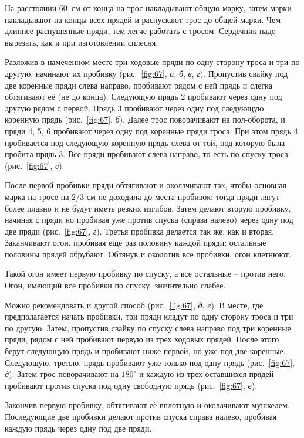 \documentclass[a4paper, 12pt, twoside, final]{scrbook}
\begin{document}
На расстоянии 60~см от конца на трос накладывают общую марку, затем марки накладывают на концы всех прядей и распускают трос до общей марки. Чем длиннее распущенные пряди, тем легче работать с тросом. Сердечник надо вырезать, как и при изготовлении сплесня.

Разложив в намеченном месте три ходовые пряди по одну сторону троса и три по другую, начинают их пробивку (рис.~\ref{fig:67}, \textit{а}, \textit{б}, \textit{в}, \textit{г}). Пропустив свайку под две коренные пряди слева направо, пробивают рядом с ней прядь и слегка обтягивают её (не до конца). Следующую прядь 2 пробивают через одну под другую рядом с первой. Прядь 3 пробивают через одну под следующую коренную прядь (рис.~\ref{fig:67}, \textit{б}). Далее трос поворачивают на пол-оборота, и пряди 4, 5, 6 пробивают через одну под коренные пряди троса. При этом прядь 4 пробивается под следующую коренную прядь слева от той, под которую была пробита прядь 3. Все пряди пробивают слева направо, то есть по спуску троса (рис.~\ref{fig:67}, \textit{в}).

После первой пробивки пряди обтягивают и околачивают так, чтобы основная марка на тросе на $2/3$ см не доходила до места пробивок: тогда пряди лягут более плавно и не будут иметь резких изгибов. Затем делают вторую пробивку, начиная с пряди но пробивая уже против спуска (справа налево) через одну под две пряди (рис.~\ref{fig:67}, \textit{г}). Третья пробивка делается так же, как и вторая. Заканчивают огон, пробивая еще раз половину каждой пряди; остальные половины прядей обрубают. Обтянув и околотив все пробивки, огон клетнюют.

Такой огон имеет первую пробивку по спуску, а все остальные \--- против него. Огон, имеющий все пробивки по спуску, значительно слабее.

Можно рекомендовать и другой способ (рис.~\ref{fig:67}, \textit{д}, \textit{е}). В месте, где предполагается начать пробивки, три пряди кладут по одну сторону троса и три по другую. Затем, пропустив свайку по спуску слева направо под три коренные пряди, рядом с ней пробивают первую из трех ходовых прядей. После этого берут следующую прядь и пробивают ниже первой, но уже под две коренные. Следующую, третью, прядь пробивают уже только под одну прядь (рис.~\ref{fig:67}, \textit{д}). Затем трос поворачивают на $180^\circ$ и каждую из трех оставшихся прядей пробивают против спуска под одну свободную прядь (рис.~\ref{fig:67}, \textit{е}).

Закончив первую пробивку, обтягивают её вплотную и околачивают мушкелем. Последующие две пробивки делают против спуска справа налево, пробивая каждую прядь через одну под две пряди.
\end{document}
